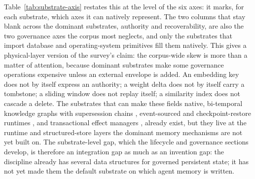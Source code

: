

Table~\ref{tab:substrate-axis} restates this at the level of the six axes: it marks, for each substrate, which axes it can natively represent. The two columns that stay blank across the dominant substrates, authority and recoverability, are also the two governance axes the corpus most neglects, and only the substrates that import database and operating-system primitives fill them natively. This gives a physical-layer version of the survey's claim: the corpus-wide skew is more than a matter of attention, because dominant substrates make some governance operations expensive unless an external envelope is added. An embedding key does not by itself express an authority; a weight delta does not by itself carry a tombstone; a sliding window does not replay itself; a similarity index does not cascade a delete. The substrates that can make these fields native, bi-temporal knowledge graphs with supersession chains \citep{wang2026engram}, event-sourced and checkpoint-restore runtimes \citep{nakajima2026regimes,dong2026deltabox,wu2026crab}, and transactional effect managers \citep{mohammadi2026atomix,chen2026cordon}, already exist, but they live at the runtime and structured-store layers the dominant memory mechanisms are not yet built on. The substrate-level gap, which the lifecycle and governance sections develop, is therefore an integration gap as much as an invention gap: the discipline already has several data structures for governed persistent state; it has not yet made them the default substrate on which agent memory is written.
